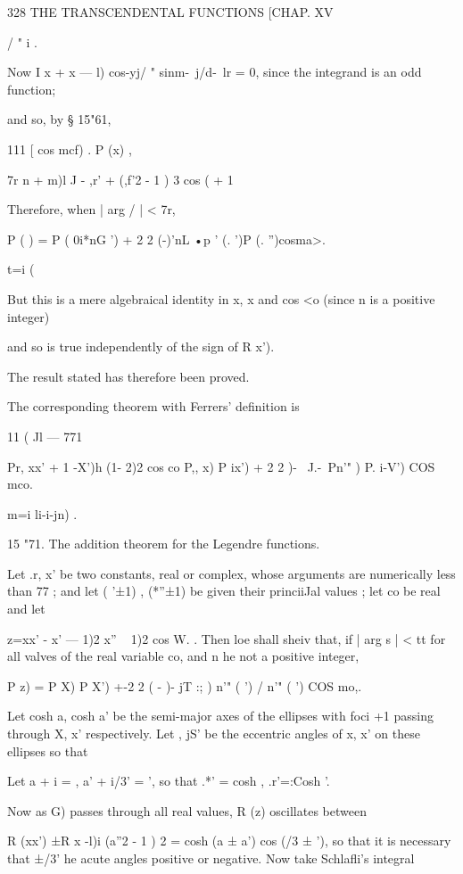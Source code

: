 {{{328 THE TRANSCENDENTAL FUNCTIONS [CHAP. XV

/ " i .

Now I x + x — l) cos-yj/ " sinm-\ j/d-\ lr = 0, since the integrand is
an odd function;

and so, by § 15"61,

111 [ cos mcf) . P (x) ,

7r n + m)l J - ,r' + (,f'2 - 1 ) 3 cos ( + 1

Therefore, when | arg / | < 7r,

P ( ) = P ( 0i*nG ') + 2 2 (-)'nL •p ' (. ')P (. '')cosma>.

 t=i (%

But this is a mere algebraical identity in x, x and cos <o (since n is
a positive integer)

and so is true independently of the sign of R x').

The result stated has therefore been proved.

The corresponding theorem with Ferrers' definition is

11 ( Jl — 771

Pr, xx' + 1 -X')h (1- 2)2 cos co P,, x) P ix') + 2 2 )- ~J.-\ Pn'" )
P. i-V') COS mco.

m=i li-i-jn) .

15 "71. The addition theorem for the Legendre functions.

Let .r, x' be two constants, real or complex, whose arguments are
numerically less than 77 ; and let ( '±1) , (*''±1) be given their
princiiJal values ; let co be real and let

z=xx' - x' — 1)2 x'' ~ 1)2 cos W. . Then loe shall sheiv that, if |
arg s | < tt for all valves of the real variable co, and n he not a
positive integer,

P z) = P X) P X') +-2 2 ( - )- jT :; ) n'" ( ') / n'" ( ') COS mo,.

Let cosh a, cosh a' be the semi-major axes of the ellipses with foci
+1 passing through X, x' respectively. Let , jS' be the eccentric
angles of x, x' on these ellipses so that

Let a + i = , a' + i/3' = ', so that .*' = cosh , .r'=:Cosh '.

Now as G) passes through all real values, R (z) oscillates between

R (xx') ±R x -l)i (a''2 - 1 ) 2 = cosh (a ± a') cos (/3 ± '), so that
it is necessary that ±/3' he acute angles positive or negative. Now
take Schlafli's integral

}}}
